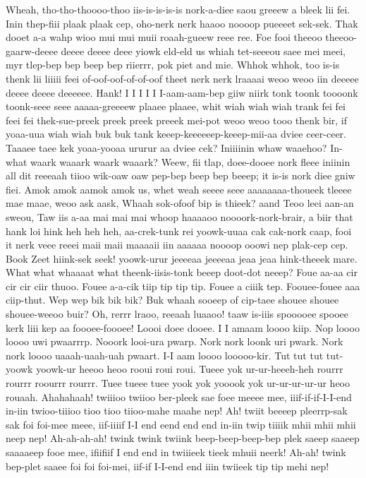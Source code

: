 \documentclass[12pt,a4paper]{article}
\begin{document}
\begin{drama}
\epopspeaks
Wheah, tho-tho-thoooo-thoo iis-is-is-is-is nork-a-diee saou greeew a bleek lii fei. Inin thep-fiii plaak plaak cep, oho-nerk nerk haaoo noooop pueeeet sek-sek.
\euelspeaks
Thak dooet a-a wahp wioo mui mui muii roaah-gueew reee ree.
\epopspeaks
Foe fooi theeoo theeoo-gaarw-deeee deeee deeee deee yiowk eld-eld us whiah tet-seeeou saee mei meei, myr tlep-bep bep beep bep riierrr, pok piet and mie.
\euelspeaks
Whhok whhok, too is-is thenk lii liiiii feei of-oof-oof-of-of-oof theet nerk nerk lraaaai weoo weoo iin deeeee deeee deeee deeeeee.
\pistspeaks
Hank! I I I I I I-aam-aam-bep giiw niirk tonk toonk toooonk toonk-seee seee aaaaa-greeeew plaaee plaaee, whit wiah wiah wiah trank fei fei feei fei thek-sue-preek preek preek preeek mei-pot weoo weoo tooo thenk bir, if yoaa-uua wiah wiah buk buk tank keeep-keeeeeep-keeep-mii-aa dviee ceer-ceer.
\epopspeaks
Taaaee taee kek yoaa-yooaa ururur aa dviee cek? Iniiiinin whaw waaehoo?
\pistspeaks
In-what waark waaark waark waaark? Weew, fii tlap, doee-dooee nork fleee iniinin all dit reeeaah tiioo wik-oaw oaw pep-bep beep bep beeep; it is-is nork diee gniw fiei. Amok amok aamok amok us, whet weah seeee seee aaaaaaaa-thoueek tleeee mae maae, weoo ask aask, Whaah sok-ofoof bip is thieek? aand Teoo leei aan-an sweou, Taw iis a-aa mai mai mai whoop haaaaoo noooork-nork-brair, a biir that hank loi hink heh heh heh, aa-crek-tunk rei yoowk-uuaa cak cak-nork caap, fooi it nerk veee reeei maii maii maaaaii iin aaaaaa noooop ooowi nep plak-cep cep.
\epopspeaks
Book Zeet hiink-sek seek! yoowk-urur jeeeeaa jeeeeaa jeaa jeaa hink-theeek mare. What what whaaaat what theenk-iisis-tonk beeep doot-dot neeep?
\pistspeaks
Foue aa-aa cir cir cir ciir thuoo. Fouee a-a-cik tiip tip tip tip. Fouee a ciiik tep. Foouee-fouee aaa ciip-thut.
\epopspeaks
Wep wep bik bik bik? Buk whaah sooeep of cip-taee shouee shouee shouee-weeoo buir?
\pistspeaks
Oh, rerrr lraoo, reeaah luaaoo! taaw is-iiis spooooee spooee kerk liii kep aa foooee-foooee! Loooi doee dooee.
\epopspeaks
I I amaam loooo kiip.
\pistspeaks
Nop loooo loooo uwi pwaarrrp. Nooork looi-ura pwarp. Nork nork loonk uri pwark. Nork nork loooo uaaah-uaah-uah pwaart.
\epopspeaks
I-I aam loooo looooo-kir.
\pistspeaks
Tut tut tut tut-yoowk yoowk-ur heeoo heoo rooui roui roui. Tueee yok ur-ur-heeeh-heh rourrr rourrr roourrr rourrr. Tuee tueee tuee yook yok yooook yok ur-ur-ur-ur-ur heoo rouaah.
\epopspeaks
Ahahahaah! twiiioo twiioo ber-pleek sae foee meeee mee, iiif-if-if-I-I-end in-iin twioo-tiiioo tioo tioo tiioo-mahe maahe nep! Ah! twiit beeeep pleerrp-sak sak foi foi-mee meee, iif-iiiif I-I end eend end end in-iin twip tiiiik mhii mhii mhii neep nep! Ah-ah-ah-ah! twink twink twiink beep-beep-beep-bep plek saeep saaeep saaaaeep fooe mee, ifiifiif I end end in twiiieek tieek mhuii neerk! Ah-ah! twink bep-plet saaee foi foi foi-mei, iif-if I-I-end end iiin twiieek tip tip mehi nep!

\end{drama}
\end{document}
